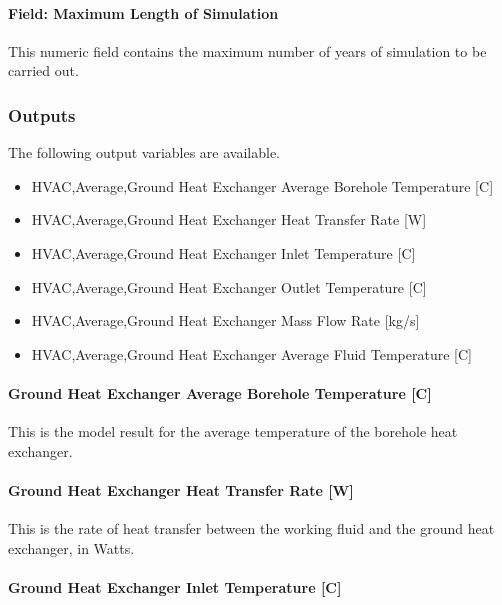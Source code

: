\paragraph{Field: Maximum Length of Simulation}\label{field-maximum-length-of-simulation-1}

This numeric field contains the maximum number of years of simulation to be carried out.

\subsubsection{Outputs}\label{outputs-11-000}

The following output variables are available.

\begin{itemize}
\item
  HVAC,Average,Ground Heat Exchanger Average Borehole Temperature {[}C{]}
\item
  HVAC,Average,Ground Heat Exchanger Heat Transfer Rate {[}W{]}
\item
  HVAC,Average,Ground Heat Exchanger Inlet Temperature {[}C{]}
\item
  HVAC,Average,Ground Heat Exchanger Outlet Temperature {[}C{]}
\item
  HVAC,Average,Ground Heat Exchanger Mass Flow Rate {[}kg/s{]}
\item
  HVAC,Average,Ground Heat Exchanger Average Fluid Temperature {[}C{]}
\end{itemize}

\paragraph{Ground Heat Exchanger Average Borehole Temperature {[}C{]}}\label{ground-heat-exchanger-average-borehole-temperature-c-1}

This is the model result for the average temperature of the borehole heat exchanger.

\paragraph{Ground Heat Exchanger Heat Transfer Rate {[}W{]}}\label{ground-heat-exchanger-heat-transfer-rate-w-1}

This is the rate of heat transfer between the working fluid and the ground heat exchanger, in Watts.

\paragraph{Ground Heat Exchanger Inlet Temperature {[}C{]}}\label{ground-heat-exchanger-inlet-temperature-c-1}

